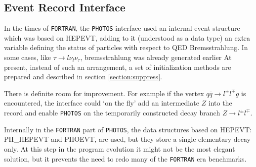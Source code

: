 \documentclass[]{Photos_interface_design}
\begin{document}
 
\subsection{Event Record Interface}
In the times of {\tt FORTRAN}, the {\tt PHOTOS} interface used an internal event structure which was
based on HEPEVT,
adding to it (understood as a data type) an extra variable defining 
the status of particles with respect to QED Bremsstrahlung. In some cases, like
$\tau \to l \nu_l \nu_\tau$, bremsstrahlung was already generated earlier
At present, instead of such an arrangement, a set of initialization methods are 
prepared and described in section \ref{section:suppress}. 

There is definite room for 
improvement. For example if the vertex $q \bar q \to l^\pm l^\mp g$ is encountered,
the interface could `on the fly' add an intermediate $Z$ into the record and enable {\tt PHOTOS}
on the temporarily constructed decay branch $Z \to l^\pm l^\mp $. 

Internally in the {\tt FORTRAN} part of {\tt PHOTOS}, the data
structures based on HEPEVT: PH\_HEPEVT and PHOEVT, are used, but they
store a single elementary decay only. At this step in the program
evolution it might not be the most elegant solution, but it prevents
the need to redo many of the {\tt FORTRAN} era benchmarks.
\end{document}
